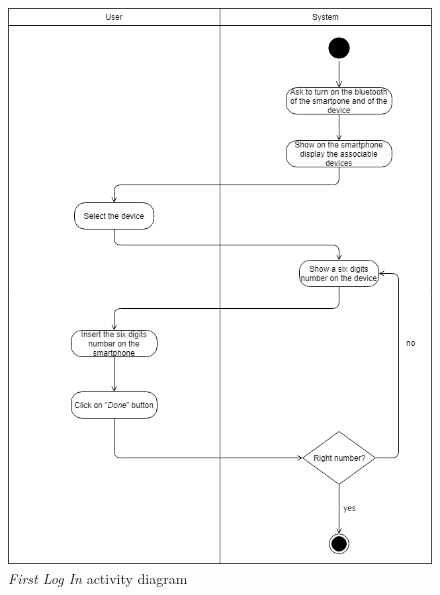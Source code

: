 \begin{figure}
\begin{center}
  \includegraphics[height=0.6\paperheight]{img/activity/FirstIndividualLogin.png}
  \hspace{0.05\linewidth}
  \centering
  \caption{\textit{First Log In} activity diagram}
  \label{img:firstIndividualLoginActivityDiagram}
\end{center}
\end{figure}

